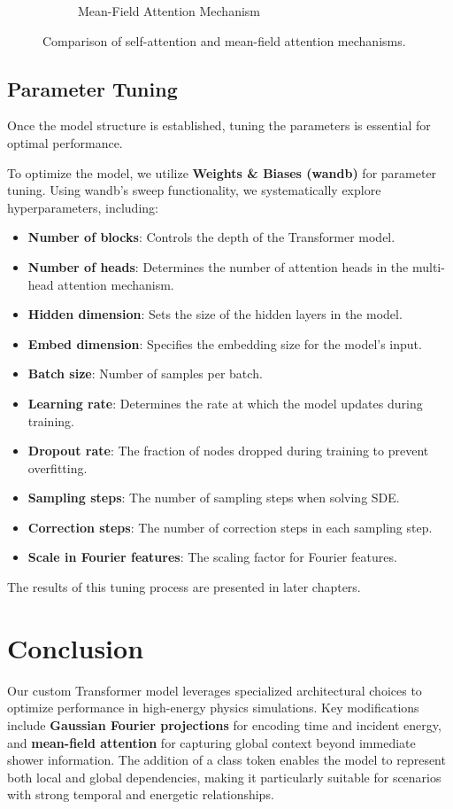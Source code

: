 \begin{figure}[ht]
\begin{subfigure}[b]{0.45\textwidth}
        \caption{Mean-Field Attention Mechanism}
        \label{fig:mean_field_attention}
    \end{subfigure}
    \caption{Comparison of self-attention and mean-field attention mechanisms.}
    \label{fig:attention_comparison}
\end{figure}

\subsection{Parameter Tuning}
Once the model structure is established, tuning the parameters is essential for optimal performance. 

To optimize the model, we utilize \textbf{Weights \& Biases (wandb)} for parameter tuning. Using wandb’s sweep functionality, we systematically explore hyperparameters, including:

\begin{itemize}
    \item \textbf{Number of blocks}: Controls the depth of the Transformer model.
    \item \textbf{Number of heads}: Determines the number of attention heads in the multi-head attention mechanism.
    \item \textbf{Hidden dimension}: Sets the size of the hidden layers in the model.
    \item \textbf{Embed dimension}: Specifies the embedding size for the model’s input.
    \item \textbf{Batch size}: Number of samples per batch.
    \item \textbf{Learning rate}: Determines the rate at which the model updates during training.
    \item \textbf{Dropout rate}: The fraction of nodes dropped during training to prevent overfitting.
    \item \textbf{Sampling steps}: The number of sampling steps when solving SDE.
    \item \textbf{Correction steps}: The number of correction steps in each sampling step.
    \item \textbf{Scale in Fourier features}: The scaling factor for Fourier features.
\end{itemize}

The results of this tuning process are presented in later chapters.

\section{Conclusion}
Our custom Transformer model leverages specialized architectural choices to optimize performance in high-energy physics simulations. Key modifications include \textbf{Gaussian Fourier projections} for encoding time and incident energy, and \textbf{mean-field attention} for capturing global context beyond immediate shower information. The addition of a class token enables the model to represent both local and global dependencies, making it particularly suitable for scenarios with strong temporal and energetic relationships.

